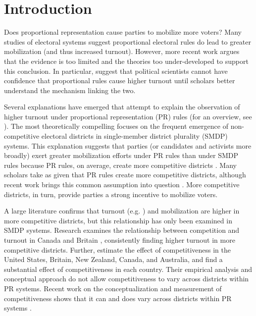\documentclass[12pt]{article}
\begin{document}
\section*{Introduction}

Does proportional representation cause parties to mobilize more voters? Many studies of electoral systems suggest proportional electoral rules do lead to greater mobilization (and thus increased turnout). However, more recent work argues that the evidence is too limited and the theories too under-developed to support this conclusion. In particular, \cite{BlaisAarts2006} suggest that political scientists cannot have confidence that proportional rules cause higher turnout until scholars better understand the mechanism linking the two. 

Several explanations have emerged that attempt to explain the observation of higher turnout under proportional representation (PR) rules (for an overview, see \citealt{BlaisAarts2006}). The most theoretically compelling focuses on the frequent emergence of non-competitive electoral districts in single-member district plurality (SMDP) systems. This explanation suggests that parties (or candidates and activists more broadly) exert greater mobilization efforts under PR rules than under SMDP rules because PR rules, on average, create more competitive districts \citep{Cox1999}. Many scholars take as given that PR rules create more competitive districts, although recent work brings this common assumption into question \citep{BlaisLago2009}. More competitive districts, in turn, provide parties a strong incentive to mobilize voters.

A large literature confirms that turnout (e.g. \citealt{RosenstoneHansen1993}) and mobilization \citep{CoxMunger1989, KarpBanducciBowler2007} are higher in more competitive districts, but this relationship has only been examined in SMDP systems. Research examines the relationship between competition and turnout in Canada \citep{MatsusakaPalda1993, Endersbyetal2002} and Britain \citep{DenverHands1974, DenverHands1985}, consistently finding higher turnout in more competitive districts. Further, \cite{KarpBanducciBowler2007} estimate the effect of competitiveness in the United States, Britain, New Zealand, Canada, and Australia, and find a substantial effect of competitiveness in each country. Their empirical analysis and conceptual approach do not allow competitiveness to vary across districts within PR systems. Recent work on the conceptualization and measurement of competitiveness shows that it can and does vary across districts within PR systems \citep{GrofmanSelb2009, Selb2009, BlaisLago2009}.
\end{document}

